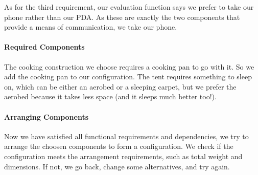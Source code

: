 \documentclass[a4paper,11pt]{article}
\begin{document}
As for the third requirement, our evaluation function says we prefer
to take our phone rather than our PDA. As these are exactly the two
components that provide a means of communication, we take our phone.

\paragraph{Required Components}

The cooking construction we choose requires a cooking pan to go
with it. So we add the cooking pan to our configuration. The tent
requires something to sleep on, which can be either an aerobed or
a sleeping carpet, but we prefer the aerobed because it takes less
space (and it sleeps much better too!).

\paragraph{Arranging Components}

Now we have satisfied all functional requirements and dependencies,
we try to arrange the choosen components to form a configuration. We
check if the configuration meets the arrangement requirements, such
as total weight and dimensions. If not, we go back, change some
alternatives, and try again.
\end{document}
